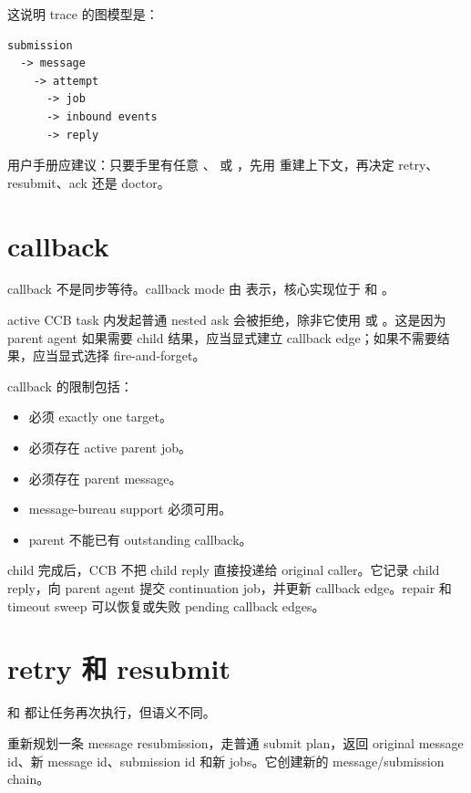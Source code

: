 这说明 trace 的图模型是：

\begin{Verbatim}[fontsize=\small,frame=single]
submission
  -> message
    -> attempt
      -> job
      -> inbound events
      -> reply
\end{Verbatim}

用户手册应建议：只要手里有任意 、 或 ，先用  重建上下文，再决定 retry、resubmit、ack 还是 doctor。

\section{callback}

callback 不是同步等待。callback mode 由  表示，核心实现位于  和 。

active CCB task 内发起普通 nested ask 会被拒绝，除非它使用  或 。这是因为 parent agent 如果需要 child 结果，应当显式建立 callback edge；如果不需要结果，应当显式选择 fire-and-forget。

callback 的限制包括：

\begin{itemize}
  \item 必须 exactly one target。
  \item 必须存在 active parent job。
  \item 必须存在 parent message。
  \item message-bureau support 必须可用。
  \item parent 不能已有 outstanding callback。
\end{itemize}

child 完成后，CCB 不把 child reply 直接投递给 original caller。它记录 child reply，向 parent agent 提交 continuation job，并更新 callback edge。repair 和 timeout sweep 可以恢复或失败 pending callback edges。

\section{retry 和 resubmit}

 和  都让任务再次执行，但语义不同。

 重新规划一条 message resubmission，走普通 submit plan，返回 original message id、新 message id、submission id 和新 jobs。它创建新的 message/submission chain。

